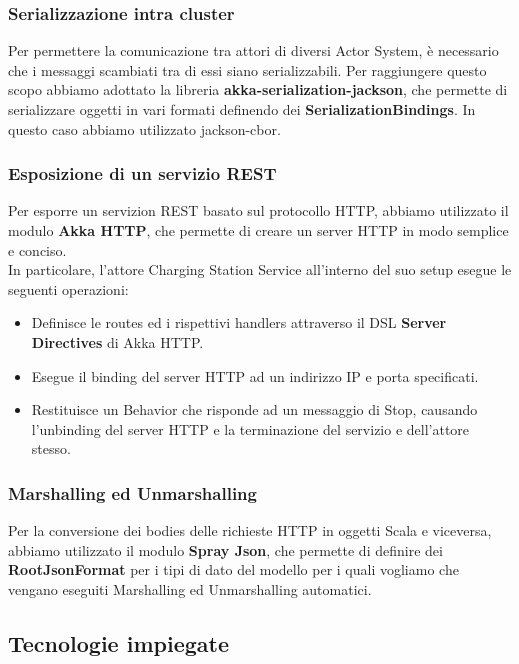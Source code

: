 \subsubsection{Serializzazione intra cluster}
Per permettere la comunicazione tra attori di diversi Actor System, è necessario che i messaggi scambiati tra di essi siano serializzabili. Per raggiungere questo scopo abbiamo adottato la libreria
\textbf{akka-serialization-jackson}, che permette di serializzare oggetti in vari formati definendo dei \textbf{SerializationBindings}. In questo caso abbiamo utilizzato jackson-cbor.

\subsubsection{Esposizione di un servizio REST}
Per esporre un servizion REST basato sul protocollo HTTP, abbiamo utilizzato il modulo \textbf{Akka HTTP}, che permette di creare un server HTTP in modo semplice e conciso.\\
In particolare, l'attore Charging Station Service all'interno del suo setup esegue le seguenti operazioni:
\begin{itemize}
      \item Definisce le routes ed i rispettivi handlers attraverso il DSL \textbf{Server Directives} di Akka HTTP.
      \item Esegue il binding del server HTTP ad un indirizzo IP e porta specificati.
      \item Restituisce un Behavior che risponde ad un messaggio di Stop, causando l'unbinding del server HTTP e la terminazione del servizio e dell'attore stesso.
\end{itemize}

\subsubsection{Marshalling ed Unmarshalling}
Per la conversione dei bodies delle richieste HTTP in oggetti Scala e viceversa, abbiamo utilizzato il modulo \textbf{Spray Json}, che permette di definire dei \textbf{RootJsonFormat} per i tipi di dato del modello per i quali vogliamo che vengano eseguiti Marshalling ed Unmarshalling automatici.\\

\subsection{Tecnologie impiegate}

